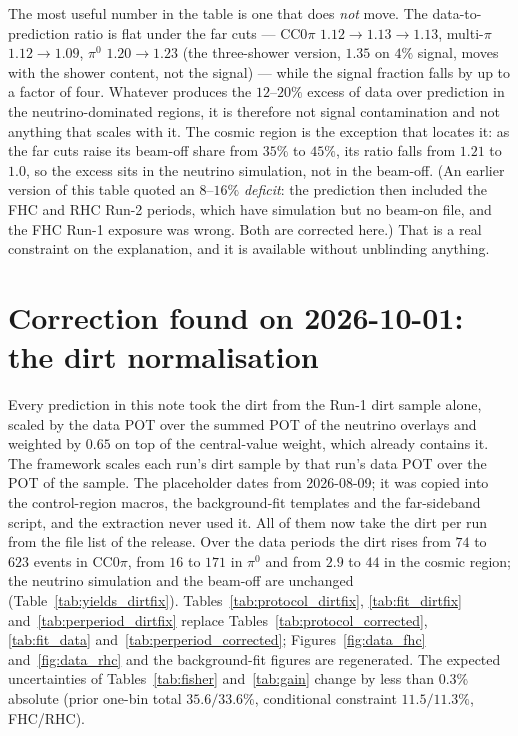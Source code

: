 \documentclass[11pt,a4paper]{article}
\begin{document}
The most useful number in the table is one that does \emph{not} move. The data-to-prediction ratio
is flat under the far cuts --- CC0$\pi$ $1.12\to1.13\to1.13$, multi-$\pi$ $1.12\to1.09$, $\pi^0$
$1.20\to1.23$ (the three-shower version, $1.35$ on $4\%$ signal, moves with the shower content, not the
signal) --- while the signal fraction falls by up to a factor of four. Whatever produces the
$12$--$20\%$ excess of data over prediction in the neutrino-dominated regions, it is therefore not
signal contamination and not anything that scales with it. The cosmic region is the exception that
locates it: as the far cuts raise its beam-off share from $35\%$ to $45\%$, its ratio falls from
$1.21$ to $1.0$, so the excess sits in the neutrino simulation, not in the beam-off. (An earlier
version of this table quoted an $8$--$16\%$ \emph{deficit}: the prediction then included the FHC and RHC
Run-2 periods, which have simulation but no beam-on file, and the FHC Run-1 exposure was wrong. Both
are corrected here.) That is a real constraint on the explanation, and it is available without
unblinding anything.

\section{Correction found on 2026-10-01: the dirt normalisation}
\label{sec:dirtfix}

Every prediction in this note took the dirt from the Run-1 dirt sample alone, scaled by the data POT over the summed
POT of the neutrino overlays and weighted by $0.65$ on top of the central-value weight, which already contains it.
The framework scales each run's dirt sample by that run's data POT over the POT of the sample. The placeholder dates
from 2026-08-09; it was copied into the control-region macros, the background-fit templates and the far-sideband
script, and the extraction never used it. All of them now take the dirt per run from the file list of the release.
Over the data periods the dirt rises from $74$ to $623$ events in CC$0\pi$, from $16$ to $171$ in $\pi^0$ and from
$2.9$ to $44$ in the cosmic region; the neutrino simulation and the beam-off are unchanged
(Table~\ref{tab:yields_dirtfix}). Tables~\ref{tab:protocol_dirtfix}, \ref{tab:fit_dirtfix}
and~\ref{tab:perperiod_dirtfix} replace Tables~\ref{tab:protocol_corrected}, \ref{tab:fit_data}
and~\ref{tab:perperiod_corrected}; Figures~\ref{fig:data_fhc} and~\ref{fig:data_rhc} and the background-fit figures
are regenerated. The expected uncertainties of Tables~\ref{tab:fisher} and~\ref{tab:gain} change by less than
$0.3\%$ absolute (prior one-bin total $35.6/33.6\%$, conditional constraint $11.5/11.3\%$, FHC/RHC).
\end{document}
